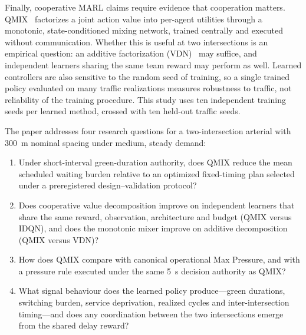 \documentclass[review,12pt]{elsarticle}
\begin{document}
Finally, cooperative MARL claims require evidence that cooperation
matters. QMIX~\cite{Rashid2018} factorizes a joint action value into
per-agent utilities through a monotonic, state-conditioned mixing
network, trained centrally and executed without communication. Whether
this is useful at two intersections is an empirical question: an
additive factorization (VDN)~\cite{sunehag2017value} may suffice, and
independent learners sharing the same team reward may perform as well.
Learned controllers are also sensitive to the random seed of training,
so a single trained policy evaluated on many traffic realizations
measures robustness to traffic, not reliability of the training
procedure. This study uses ten independent training seeds per learned
method, crossed with ten held-out traffic seeds.

The paper addresses four research questions for a two-intersection
arterial with 300~m nominal spacing under medium, steady demand:
\begin{enumerate}[label=\textbf{RQ\arabic*.}, leftmargin=1.5cm]
\item Under short-interval green-duration authority, does QMIX reduce
the mean scheduled waiting burden relative to an optimized fixed-timing
plan selected under a preregistered design--validation protocol?
\item Does cooperative value decomposition improve on independent
learners that share the same reward, observation, architecture and
budget (QMIX versus IDQN), and does the monotonic mixer improve on
additive decomposition (QMIX versus VDN)?
\item How does QMIX compare with canonical operational Max Pressure, and
with a pressure rule executed under the same 5~s decision authority as
QMIX?
\item What signal behaviour does the learned policy produce---green
durations, switching burden, service deprivation, realized cycles and
inter-intersection timing---and does any coordination between the two
intersections emerge from the shared delay reward?
\end{enumerate}
\end{document}
